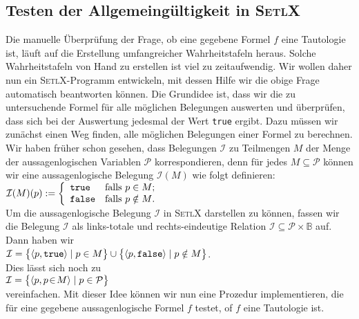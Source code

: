 \subsection{Testen der Allgemeing\"{u}ltigkeit in \textsc{SetlX}}
\noindent
 Die manuelle \"{U}berpr\"{u}fung der Frage, ob eine gegebene Formel $f$ eine Tautologie ist, 
l\"{a}uft auf die Erstellung umfangreicher Wahrheitstafeln heraus.   Solche Wahrheitstafeln
von Hand zu erstellen ist viel zu zeitaufwendig. 
Wir wollen daher nun ein \textsc{SetlX}-Programm entwickeln, mit dessen Hilfe wir die
obige Frage automatisch beantworten k\"{o}nnen.   Die Grundidee ist, dass wir die zu untersuchende
Formel f\"{u}r alle m\"{o}glichen Belegungen auswerten und \"{u}berpr\"{u}fen, dass sich bei der Auswertung
jedesmal der Wert \texttt{true} ergibt.  Dazu m\"{u}ssen wir zun\"{a}chst einen Weg finden, alle
m\"{o}glichen Belegungen einer Formel zu berechnen.  Wir haben fr\"{u}her schon gesehen, dass
Belegungen $\mathcal{I}$ zu Teilmengen $M$ der Menge der aussagenlogischen Variablen
$\mathcal{P}$ korrespondieren, denn f\"{u}r jedes $M \subseteq \mathcal{P}$ k\"{o}nnen wir eine
aussagenlogische Belegung $\mathcal{I}(M)$ wie folgt definieren:
\\[0.2cm]
\hspace*{1.3cm}
$\mathcal{I}(M)(p) := \left\{
\begin{array}[c]{ll}
  \mathtt{true}  & \mbox{falls $p \in M$;} \\
  \mathtt{false} & \mbox{falls $p \notin M$.}
\end{array}
\right.
$
\\[0.2cm]
Um die aussagenlogische Belegung $\mathcal{I}$ in \textsc{SetlX} darstellen zu k\"{o}nnen,
fassen wir die Belegung $\mathcal{I}$ als links-totale und rechts-eindeutige Relation
$\mathcal{I} \subseteq \mathcal{P} \times \mathbb{B}$ auf.  Dann haben wir
\\[0.2cm]
\hspace*{1.3cm}
$\mathcal{I} = \bigl\{ \pair(p, \mathtt{true} ) \mid p \in    M \bigr\} \cup 
               \bigl\{ \pair(p, \mathtt{false}) \mid p \notin M \bigr\}
$.
\\[0.2cm]
Dies l\"{a}sst sich noch zu
\\[0.2cm]
\hspace*{1.3cm}
$\mathcal{I} = \bigl\{ \langle p, p \!\in\! M\rangle \mid  p \in \mathcal{P} \bigr\}$
\\[0.2cm]
vereinfachen.  Mit dieser Idee k\"{o}nnen wir nun eine Prozedur implementieren, die f\"{u}r eine
gegebene aussagenlogische Formel $f$ testet, of $f$ eine Tautologie ist.

